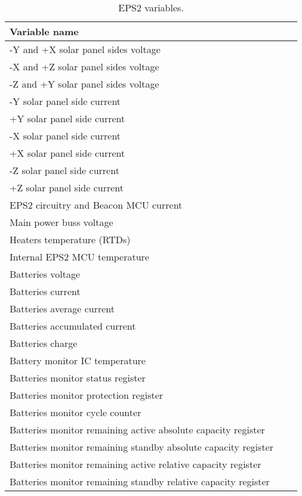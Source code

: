 \begin{table}[!h]
    \centering
    \begin{tabular}{lcc}
        \toprule[1.5pt]
        \textbf{Variable name}                  \\
        \midrule
        -Y and +X solar panel sides voltage     \\
        -X and +Z solar panel sides voltage     \\
        -Z and +Y solar panel sides voltage     \\
        -Y solar panel side current             \\
        +Y solar panel side current             \\
        -X solar panel side current             \\
        +X solar panel side current             \\
        -Z solar panel side current             \\
        +Z solar panel side current             \\
        EPS2 circuitry and Beacon MCU current   \\
        Main power buss voltage                 \\
        Heaters temperature (RTDs)              \\
        Internal EPS2 MCU temperature           \\
        Batteries voltage                       \\
        Batteries current                       \\
        Batteries average current               \\
        Batteries accumulated current           \\
        Batteries charge                        \\
        Battery monitor IC temperature          \\
        Batteries monitor status register       \\
        Batteries monitor protection register   \\
        Batteries monitor cycle counter         \\
        Batteries monitor remaining active absolute capacity register   \\
        Batteries monitor remaining standby absolute capacity register  \\
        Batteries monitor remaining active relative capacity register   \\
        Batteries monitor remaining standby relative capacity register  \\
        \bottomrule[1.5pt]
    \end{tabular}
    \caption{EPS2 variables.}
    \label{tab:eps2-variables}
\end{table}


